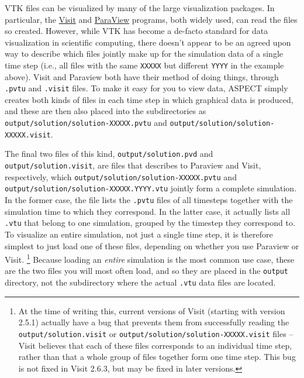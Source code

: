 \documentclass{article}
\newcommand{\aspect}{\textsc{ASPECT}}
\begin{document}
\begin{itemize}
  VTK files can be visualized by many of the large visualization packages. In
  particular, the
  \href{https://visit.llnl.gov}{Visit} and
  \href{http://www.paraview.org/}{ParaView} programs, both
  widely used, can read the files so created. However, while VTK has become a
  de-facto standard for data visualization in scientific computing, there
  doesn't appear to be an agreed upon way to describe which files jointly make
  up for the simulation data of a single time step (i.e., all files with the
  same \texttt{XXXXX} but different \texttt{YYYY} in the example above). Visit
  and Paraview both have their method of doing things, through \texttt{.pvtu} and
  \texttt{.visit} files. To make it easy for you to view data, \aspect{}
  simply creates both kinds of files in each time step in which graphical data
  is produced, and these are then also placed into the subdirectories as
  \texttt{output/solution/solution-XXXXX.pvtu} and
  \texttt{output/solution/solution-XXXXX.visit}.

  The final two files of this kind, \texttt{output/solution.pvd} and
  \texttt{output/solution.visit}, are files that
  describes to Paraview and Visit, respectively, which
  \texttt{output/solution/solution-XXXXX.pvtu} and
  \texttt{output/solution/solution-XXXXX.YYYY.vtu} jointly form a complete
  simulation.
  In the former case, the file lists the \texttt{.pvtu} files of all
  timesteps together with the simulation time to which they correspond. In the
  latter case, it actually lists all \texttt{.vtu} that belong to one
  simulation, grouped by the timestep they correspond to.
  To visualize an entire simulation, not just a single time step, it is
  therefore simplest to just load one of these files, depending on whether you
  use Paraview or Visit.%
  \footnote{At the time of writing this, current versions of Visit (starting
    with version 2.5.1) actually have a bug that prevents them from
    successfully reading the \texttt{output/solution.visit} or
    \texttt{output/solution/solution-XXXXX.visit} files -- Visit believes that
    each of these files corresponds to an individual time step, rather than that a whole
    group of files together form one time step. This bug is not fixed in Visit
    2.6.3, but may be fixed in later versions.}
  Because loading an \textit{entire} simulation is the most common use case,
  these are the two files you will most often load, and so they are placed in
  the \texttt{output} directory, not the subdirectory where the actual
  \texttt{.vtu} data files are located.


\end{itemize}
\end{document}

